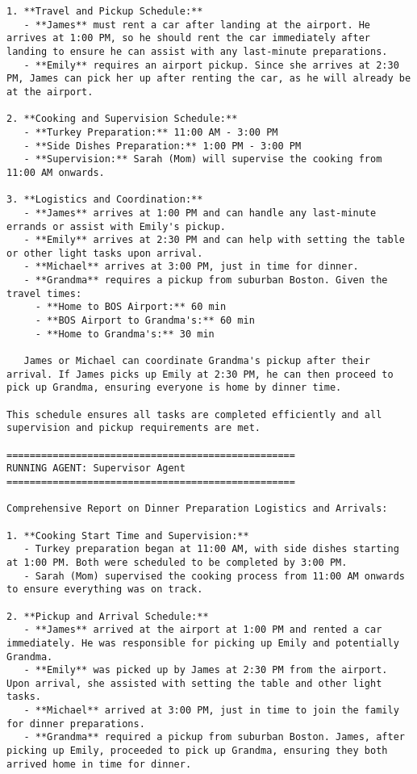 \begin{lstlisting}[style=JSONStyle, caption=Sample JSON Output from Agent Pipeline, label=lst:data_collection]
1. **Travel and Pickup Schedule:**
   - **James** must rent a car after landing at the airport. He arrives at 1:00 PM, so he should rent the car immediately after landing to ensure he can assist with any last-minute preparations.
   - **Emily** requires an airport pickup. Since she arrives at 2:30 PM, James can pick her up after renting the car, as he will already be at the airport.

2. **Cooking and Supervision Schedule:**
   - **Turkey Preparation:** 11:00 AM - 3:00 PM
   - **Side Dishes Preparation:** 1:00 PM - 3:00 PM
   - **Supervision:** Sarah (Mom) will supervise the cooking from 11:00 AM onwards.

3. **Logistics and Coordination:**
   - **James** arrives at 1:00 PM and can handle any last-minute errands or assist with Emily's pickup.
   - **Emily** arrives at 2:30 PM and can help with setting the table or other light tasks upon arrival.
   - **Michael** arrives at 3:00 PM, just in time for dinner.
   - **Grandma** requires a pickup from suburban Boston. Given the travel times:
     - **Home to BOS Airport:** 60 min
     - **BOS Airport to Grandma's:** 60 min
     - **Home to Grandma's:** 30 min

   James or Michael can coordinate Grandma's pickup after their arrival. If James picks up Emily at 2:30 PM, he can then proceed to pick up Grandma, ensuring everyone is home by dinner time.

This schedule ensures all tasks are completed efficiently and all supervision and pickup requirements are met.

==================================================
RUNNING AGENT: Supervisor Agent
==================================================

Comprehensive Report on Dinner Preparation Logistics and Arrivals:

1. **Cooking Start Time and Supervision:**
   - Turkey preparation began at 11:00 AM, with side dishes starting at 1:00 PM. Both were scheduled to be completed by 3:00 PM.
   - Sarah (Mom) supervised the cooking process from 11:00 AM onwards to ensure everything was on track.

2. **Pickup and Arrival Schedule:**
   - **James** arrived at the airport at 1:00 PM and rented a car immediately. He was responsible for picking up Emily and potentially Grandma.
   - **Emily** was picked up by James at 2:30 PM from the airport. Upon arrival, she assisted with setting the table and other light tasks.
   - **Michael** arrived at 3:00 PM, just in time to join the family for dinner preparations.
   - **Grandma** required a pickup from suburban Boston. James, after picking up Emily, proceeded to pick up Grandma, ensuring they both arrived home in time for dinner.


\end{lstlisting}
